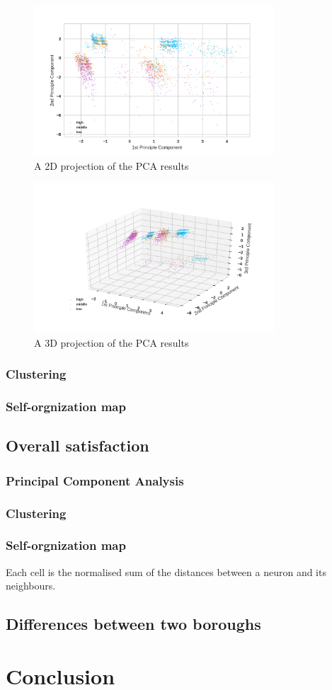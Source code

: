 \documentclass[12pt]{article}
\begin{document}
\begin{figure}[htb]
\centering
\includegraphics[width = 0.8\textwidth]{images/pca1-2d.png}
\caption{A 2D projection of the PCA results}
\label{fig:pca1-2d}
\end{figure}
\begin{figure}[htb]
\centering
\includegraphics[width = 0.8\textwidth]{images/pca1-3d.png}
\caption{A 3D projection of the PCA results}
\label{fig:pca1-3d}
\end{figure}
\subsubsection{Clustering}

\subsubsection{Self-orgnization map}

\subsection{Overall satisfaction}
\subsubsection{Principal Component Analysis}
\subsubsection{Clustering}
\subsubsection{Self-orgnization map}
Each cell is the normalised sum of the distances between a neuron and its neighbours.

\subsection{Differences between two boroughs}
\section{Conclusion}

\newpage

\end{document}
